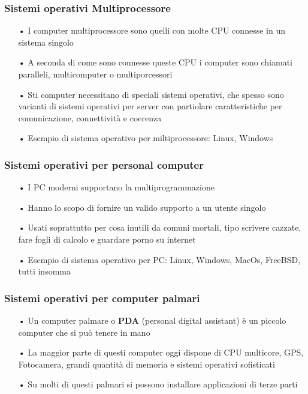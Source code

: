 \documentclass{article}
\begin{document}
\subsubsection{Sistemi operativi Multiprocessore}
\begin{enumerate}
   \item[•] I computer multiprocessore sono quelli con molte CPU connesse in un sistema singolo
   \item[•] A seconda di come sono connesse queste CPU i computer sono chiamati paralleli, multicomputer o multiporcessori
   \item[•] Sti computer necessitano di speciali sistemi operativi, che spesso sono varianti di sistemi operativi per server con partiolare caratteristiche per comunicazione, connettività e coerenza
   \item[•] Esempio di sistema operativo per miltiprocessore: Linux, Windows 
\end{enumerate}

\subsubsection{Sistemi operativi per personal computer}
\begin{enumerate}
   \item[•] I PC moderni supportano la multiprogrammazione 
   \item[•] Hanno lo scopo di fornire un valido supporto a un utente singolo 
   \item[•] Usati soprattutto per cosa inutili da comuni mortali, tipo scrivere cazzate, fare fogli di calcolo e guardare porno su internet
   \item[•] Esempio di sistema operativo per PC: Linux, Windows, MacOs, FreeBSD, tutti insomma
\end{enumerate}

\subsubsection{Sistemi operativi per computer palmari}
\begin{enumerate}
   \item[•] Un computer palmare o \textbf{PDA} (personal digital assistant) è un piccolo computer che si può tenere in mano 
   \item[•] La maggior parte di questi computer oggi dispone di CPU multicore, GPS, Fotocamera, grandi quantità di memoria e sistemi operativi sofisticati
   \item[•] Su molti di questi palmari si possono installare applicazioni di terze parti 
\end{enumerate}
\end{document}
